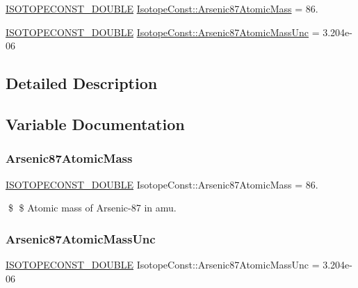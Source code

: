 \begin{DoxyCompactItemize}
\item 
\mbox{\hyperlink{group___isotope_const-_macros_ga8f45a7272ce02c0b4c65c44636ed719a}{I\+S\+O\+T\+O\+P\+E\+C\+O\+N\+S\+T\+\_\+\+D\+O\+U\+B\+LE}} \mbox{\hyperlink{group___isotope_const-_arsenic-_as87_ga7ba65846d3ee33ca6809ba93a4c7b2b3}{Isotope\+Const\+::\+Arsenic87\+Atomic\+Mass}} = 86.
\item 
\mbox{\hyperlink{group___isotope_const-_macros_ga8f45a7272ce02c0b4c65c44636ed719a}{I\+S\+O\+T\+O\+P\+E\+C\+O\+N\+S\+T\+\_\+\+D\+O\+U\+B\+LE}} \mbox{\hyperlink{group___isotope_const-_arsenic-_as87_ga5c5d49fd755b09d79509603ddab06e94}{Isotope\+Const\+::\+Arsenic87\+Atomic\+Mass\+Unc}} = 3.\+204e-\/06
\end{DoxyCompactItemize}


\subsection{Detailed Description}


\subsection{Variable Documentation}
\mbox{\label{group___isotope_const-_arsenic-_as87_ga7ba65846d3ee33ca6809ba93a4c7b2b3}} 
\subsubsection{\texorpdfstring{Arsenic87\+Atomic\+Mass}{Arsenic87AtomicMass}}
{\footnotesize\ttfamily \mbox{\hyperlink{group___isotope_const-_macros_ga8f45a7272ce02c0b4c65c44636ed719a}{I\+S\+O\+T\+O\+P\+E\+C\+O\+N\+S\+T\+\_\+\+D\+O\+U\+B\+LE}} Isotope\+Const\+::\+Arsenic87\+Atomic\+Mass = 86.}

\$ \$ Atomic mass of Arsenic-\/87 in amu. \mbox{\label{group___isotope_const-_arsenic-_as87_ga5c5d49fd755b09d79509603ddab06e94}} 
\subsubsection{\texorpdfstring{Arsenic87\+Atomic\+Mass\+Unc}{Arsenic87AtomicMassUnc}}
{\footnotesize\ttfamily \mbox{\hyperlink{group___isotope_const-_macros_ga8f45a7272ce02c0b4c65c44636ed719a}{I\+S\+O\+T\+O\+P\+E\+C\+O\+N\+S\+T\+\_\+\+D\+O\+U\+B\+LE}} Isotope\+Const\+::\+Arsenic87\+Atomic\+Mass\+Unc = 3.\+204e-\/06}

